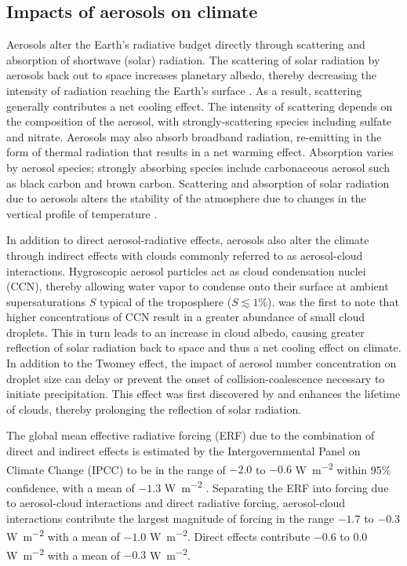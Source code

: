 \subsection{Impacts of aerosols on climate}

Aerosols alter the Earth's radiative budget directly through scattering and absorption of shortwave (solar) radiation. The scattering of solar radiation by aerosols back out to space increases planetary albedo, thereby decreasing the intensity of radiation reaching the Earth's surface \parencite{charlson_climate_1969, charlson_climate_1992}. As a result, scattering generally contributes a net cooling effect. The intensity of scattering depends on the composition of the aerosol, with strongly-scattering species including sulfate and nitrate. Aerosols may also absorb broadband radiation, re-emitting in the form of thermal radiation that results in a net warming effect. Absorption varies by aerosol species; strongly absorbing species include carbonaceous aerosol such as black carbon and brown carbon.  Scattering and absorption of solar radiation due to aerosols alters the stability of the atmosphere due to changes in the vertical profile of temperature \parencite{li_scattering_2022, lau_observational_2006}. 

In addition to direct aerosol-radiative effects, aerosols also alter the climate through indirect effects with clouds commonly referred to as aerosol-cloud interactions. Hygroscopic aerosol particles act as cloud condensation nuclei (CCN), thereby allowing water vapor to condense onto their surface at ambient supersaturations $S$ typical of the troposphere ($S\lesssim1\%$). \textcite{twomey_influence_1977} was the first to note that higher concentrations of CCN result in a greater abundance of small cloud droplets. This in turn leads to an increase in cloud albedo, causing greater reflection of solar radiation back to space and thus a net cooling effect on climate. In addition to the Twomey effect, the impact of aerosol number concentration on droplet size can delay or prevent the onset of collision-coalescence necessary to initiate precipitation. This effect was first discovered by \textcite{albrecht_aerosols_1989} and enhances the lifetime of clouds, thereby prolonging the reflection of solar radiation. 


The global mean effective radiative forcing (ERF) due to the combination of direct and indirect effects is estimated by the Intergovernmental Panel on Climate Change (IPCC) to be in the range of $-2.0$ to $-0.6$ \si{W.m^{-2}} within 95\% confidence, with a mean of $-1.3$ \si{W.m^{-2}} \parencite{ipcc_report_2021}. Separating the ERF into forcing due to aerosol-cloud interactions and direct radiative forcing, aerosol-cloud interactions contribute the largest magnitude of forcing in the range $-1.7$ to $-0.3$ \si{W.m^{-2}} with a mean of $-1.0$ \si{W.m^{-2}}. Direct effects contribute $-0.6$ to $0.0$ \si{W.m^{-2}} with a mean of $-0.3$ \si{W.m^{-2}}. 

